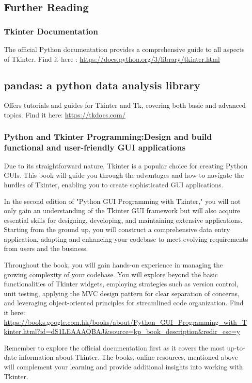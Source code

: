 \subsection{Further Reading}

\subsubsection{Tkinter Documentation}

The official Python documentation provides a comprehensive guide to all aspects of Tkinter. Find it here : \url{https://docs.python.org/3/library/tkinter.html}

\subsection{pandas: a python data analysis library}

Offers tutorials and guides for Tkinter and Tk, covering both basic and advanced topics.
Find it here: \url{https://tkdocs.com/}

\subsubsection{Python and Tkinter Programming:Design and build functional and user-friendly GUI applications}

Due to its straightforward nature, Tkinter is a popular choice for creating Python GUIs. This book will guide you through the advantages and how to navigate the hurdles of Tkinter, enabling you to create sophisticated GUI applications.

In the second edition of "Python GUI Programming with Tkinter," you will not only gain an understanding of the Tkinter GUI framework but will also acquire essential skills for designing, developing, and maintaining extensive applications. Starting from the ground up, you will construct a comprehensive data entry application, adapting and enhancing your codebase to meet evolving requirements from users and the business.

Throughout the book, you will gain hands-on experience in managing the growing complexity of your codebase. You will explore beyond the basic functionalities of Tkinter widgets, employing strategies such as version control, unit testing, applying the MVC design pattern for clear separation of concerns, and leveraging object-oriented principles for streamlined code organization.
Find it here: \url{https://books.google.com.hk/books/about/Python_GUI_Programming_with_Tkinter.html?id=dS1LEAAAQBAJ&source=kp_book_description&redir_esc=y}


Remember to explore the official documentation first as it covers the most up-to-date information about Tkinter. The books, online resources,  mentioned above will complement your learning and provide additional insights into working with Tkinter.




